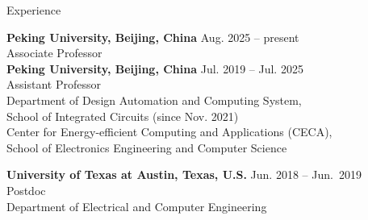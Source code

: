 
\begin{rSection}{Experience}

{\bf Peking University, Beijing, China}                           \hfill {Aug. 2025 -- present} \\
Associate Professor \\
{\bf Peking University, Beijing, China}                           \hfill {Jul. 2019 -- Jul. 2025} \\
Assistant Professor \\
Department of Design Automation and Computing System, \\
School of Integrated Circuits (since Nov. 2021) \\
Center for Energy-efficient Computing and Applications (CECA), \\
School of Electronics Engineering and Computer Science

{\bf University of Texas at Austin, Texas, U.S.}                           \hfill {Jun. 2018 -- Jun.~2019} \\
Postdoc \\
Department of Electrical and Computer Engineering

%
%
%
%


\end{rSection}


